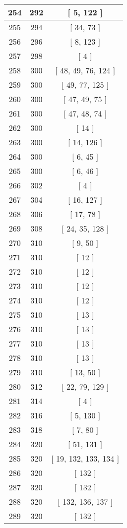 \begin{center}
\begin{longtable}[H]{|| c c c ||}
\hline
254 & 292 & [ 5, 122 ] \\ 
\hline
255 & 294 & [ 34, 73 ] \\ 
\hline
256 & 296 & [ 8, 123 ] \\ 
\hline
257 & 298 & [ 4 ] \\ 
\hline
258 & 300 & [ 48, 49, 76, 124 ] \\ 
\hline
259 & 300 & [ 49, 77, 125 ] \\ 
\hline
260 & 300 & [ 47, 49, 75 ] \\ 
\hline
261 & 300 & [ 47, 48, 74 ] \\ 
\hline
262 & 300 & [ 14 ] \\ 
\hline
263 & 300 & [ 14, 126 ] \\ 
\hline
264 & 300 & [ 6, 45 ] \\ 
\hline
265 & 300 & [ 6, 46 ] \\ 
\hline
266 & 302 & [ 4 ] \\ 
\hline
267 & 304 & [ 16, 127 ] \\ 
\hline
268 & 306 & [ 17, 78 ] \\ 
\hline
269 & 308 & [ 24, 35, 128 ] \\ 
\hline
270 & 310 & [ 9, 50 ] \\ 
\hline
271 & 310 & [ 12 ] \\ 
\hline
272 & 310 & [ 12 ] \\ 
\hline
273 & 310 & [ 12 ] \\ 
\hline
274 & 310 & [ 12 ] \\ 
\hline
275 & 310 & [ 13 ] \\ 
\hline
276 & 310 & [ 13 ] \\ 
\hline
277 & 310 & [ 13 ] \\ 
\hline
278 & 310 & [ 13 ] \\ 
\hline
279 & 310 & [ 13, 50 ] \\ 
\hline
280 & 312 & [ 22, 79, 129 ] \\ 
\hline
281 & 314 & [ 4 ] \\ 
\hline
282 & 316 & [ 5, 130 ] \\ 
\hline
283 & 318 & [ 7, 80 ] \\ 
\hline
284 & 320 & [ 51, 131 ] \\ 
\hline
285 & 320 & [ 19, 132, 133, 134 ] \\ 
\hline
286 & 320 & [ 132 ] \\ 
\hline
287 & 320 & [ 132 ] \\ 
\hline
288 & 320 & [ 132, 136, 137 ] \\ 
\hline
289 & 320 & [ 132 ] \\ 

\end{longtable}
\end{center}
